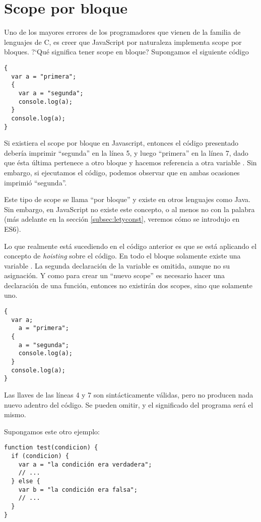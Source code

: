 \section{Scope por bloque}
\label{sec:scopebloque}

Uno de los mayores errores de los programadores que vienen de la familia de lenguajes de C, es creer que JavaScript por naturaleza implementa scope por bloques. ?`Qué significa tener scope en bloque? Supongamos el siguiente código

\begin{lstlisting}
{
  var a = "primera";
  {
    var a = "segunda";
    console.log(a);
  }
  console.log(a);
}
\end{lstlisting}

Si existiera el scope por bloque en Javascript, entonces el código presentado debería imprimir "`segunda"' en la línea 5, y luego "`primera"' en la línea 7, dado que ésta última pertenece a otro bloque y hacemos referencia a otra variable . Sin embargo, si ejecutamos el código, podemos observar que en ambas ocasiones imprimió "`segunda"'.

Este tipo de scope se llama "`por bloque"' y existe en otros lenguajes como Java. Sin embargo, en JavaScript no existe este concepto, o al menos no con la palabra  (más adelante en la sección \ref{subsec:letyconst}, veremos cómo se introdujo en ES6).

Lo que realmente está sucediendo en el código anterior es que se está aplicando el concepto de \textit{hoisting} sobre el código. En todo el bloque solamente existe una variable . La segunda declaración de la variable es omitida, aunque no su asignación. Y como para crear un "`nuevo scope"' es necesario hacer una declaración de una función, entonces no existirán dos scopes, sino que solamente uno.

\begin{lstlisting}[title={Código equivalente al ejemplo anterior}]
{
  var a;
	a = "primera";
  {
    a = "segunda";
    console.log(a);
  }
  console.log(a);
}
\end{lstlisting}

Las llaves \code{\{\}} de las líneas 4 y 7 son sintácticamente válidas, pero no producen nada nuevo adentro del código. Se pueden omitir, y el significado del programa será el mismo.

Supongamos este otro ejemplo:

\begin{lstlisting}
function test(condicion) {
  if (condicion) {
    var a = "la condición era verdadera";
    // ...
  } else {
    var b = "la condición era falsa";
    // ...
  }
}
\end{lstlisting}

